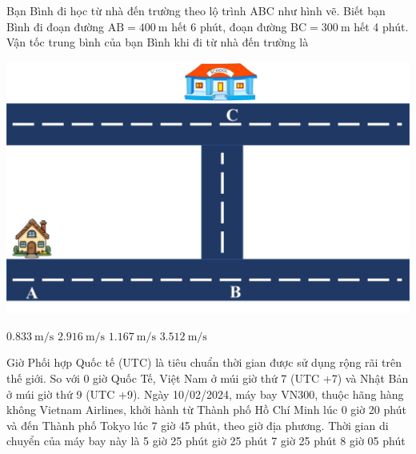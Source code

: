 \begin{ex}
	Bạn Bình đi học từ nhà đến trường theo lộ trình ABC như hình vẽ. Biết bạn Bình đi đoạn đường $\mathrm{AB}=\SI{400}{\meter}$ hết 6 phút, đoạn đường $\mathrm{BC}=\SI{300}{\meter}$ hết 4 phút. Vận tốc trung bình của bạn Bình khi đi từ nhà đến trường là
	\begin{center}
		\includegraphics[width=0.4\linewidth]{../figs/D10-1-3}
	\end{center}
	\choice
	{\True $\SI{0.833}{\meter/\second}$}
	{$\SI{2.916}{\meter/\second}$}
	{$\SI{1.167}{\meter/\second}$}
	{$\SI{3.512}{\meter/\second}$}
\end{ex}
\begin{ex}
	Giờ Phối hợp Quốc tế (UTC) là tiêu chuẩn thời gian được sử dụng rộng rãi trên thế giới. So với 0 giờ Quốc Tế, Việt Nam ở múi giờ thứ 7 (UTC +7) và Nhật Bản ở múi giờ thứ 9 (UTC +9). Ngày 10/02/2024, máy bay VN300, thuộc hãng hàng không Vietnam Airlines, khởi hành từ Thành phố Hồ Chí Minh lúc 0 giờ 20 phút và đến Thành phố Tokyo lúc 7 giờ 45 phút, theo giờ địa phương. Thời gian di chuyển của máy bay này là
	\choice
	{5 giờ 25 phút}
	{ giờ 25 phút}
	{7 giờ 25 phút}
	{8 giờ 05 phút}
	\loigiai{
	}
\end{ex}

